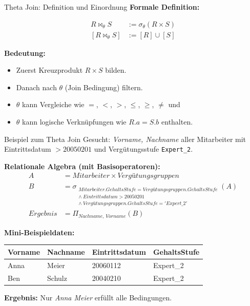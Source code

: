 \documentclass[aspectratio=169,11pt]{beamer}
\begin{document}
\begin{frame}{Theta Join: Definition und Einordnung}
\textbf{Formale Definition:}

\begin{align*}
    R \bowtie_{\theta} S &:= \sigma_{\theta}(R \times S) \\
    [R \bowtie_{\theta} S] &:= [R] \cup [S]
\end{align*}

\textbf{Bedeutung:}
\begin{itemize}
    \item Zuerst Kreuzprodukt $R \times S$ bilden.
    \item Danach nach $\theta$ (Join Bedingung) filtern.
    \item $\theta$ kann Vergleiche wie $=$, $<$, $>$, $\leq$, $\geq$, $\neq$ und
    \item $\theta$ kann logische Verknüpfungen wie $R.a = S.b$ enthalten.
\end{itemize}

\end{frame}

\begin{frame}{Beispiel zum Theta Join}
Gesucht: \textit{Vorname, Nachname} aller Mitarbeiter mit
Eintrittsdatum $> 20050201$ und Vergütungsstufe \texttt{Expert\_2}.

\vspace{0.3em}
\textbf{Relationale Algebra (mit Basisoperatoren):}
\begin{align*}
A &= Mitarbeiter \times Vergütungsgruppen \\
B &= \sigma_{\substack{Mitarbeiter.GehaltsStufe = Vergütungsgruppen.GehaltsStufe \\
     \land\ Eintrittsdatum > 20050201 \\
     \land\ Vergütungsgruppen.GehaltsStufe = 'Expert\_2'}}(A) \\
Ergebnis &= \Pi_{Nachname,\,Vorname}(B)
\end{align*}

\textbf{Mini-Beispieldaten:}
\begin{center}
\begin{tabular}{llll}
\toprule
Vorname & Nachname & Eintrittsdatum & GehaltsStufe \\
\midrule
Anna & Meier & 20060112 & Expert\_2 \\
Ben & Schulz & 20040210 & Expert\_2 \\
\bottomrule
\end{tabular}
\end{center}

\textbf{Ergebnis:} Nur \textit{Anna Meier} erfüllt alle Bedingungen.
\end{frame}
\end{document}
